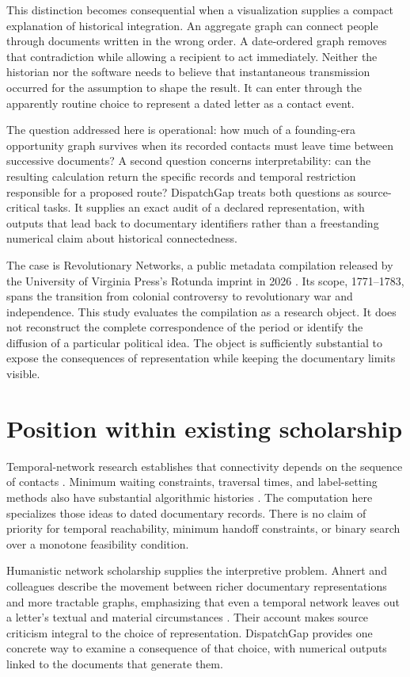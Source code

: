 \documentclass[11pt]{article}
\begin{document}
This distinction becomes consequential when a visualization supplies a compact explanation of historical integration. An aggregate graph can connect people through documents written in the wrong order. A date-ordered graph removes that contradiction while allowing a recipient to act immediately. Neither the historian nor the software needs to believe that instantaneous transmission occurred for the assumption to shape the result. It can enter through the apparently routine choice to represent a dated letter as a contact event.

The question addressed here is operational: how much of a founding-era opportunity graph survives when its recorded contacts must leave time between successive documents? A second question concerns interpretability: can the resulting calculation return the specific records and temporal restriction responsible for a proposed route? DispatchGap treats both questions as source-critical tasks. It supplies an exact audit of a declared representation, with outputs that lead back to documentary identifiers rather than a freestanding numerical claim about historical connectedness.

The case is Revolutionary Networks, a public metadata compilation released by the University of Virginia Press's Rotunda imprint in 2026 \cite{rotunda}. Its scope, 1771--1783, spans the transition from colonial controversy to revolutionary war and independence. This study evaluates the compilation as a research object. It does not reconstruct the complete correspondence of the period or identify the diffusion of a particular political idea. The object is sufficiently substantial to expose the consequences of representation while keeping the documentary limits visible.

\section{Position within existing scholarship}
Temporal-network research establishes that connectivity depends on the sequence of contacts \cite{holme}. Minimum waiting constraints, traversal times, and label-setting methods also have substantial algorithmic histories \cite{bazgan}. The computation here specializes those ideas to dated documentary records. There is no claim of priority for temporal reachability, minimum handoff constraints, or binary search over a monotone feasibility condition.

Humanistic network scholarship supplies the interpretive problem. Ahnert and colleagues describe the movement between richer documentary representations and more tractable graphs, emphasizing that even a temporal network leaves out a letter's textual and material circumstances \cite{ahnert}. Their account makes source criticism integral to the choice of representation. DispatchGap provides one concrete way to examine a consequence of that choice, with numerical outputs linked to the documents that generate them.
\end{document}
